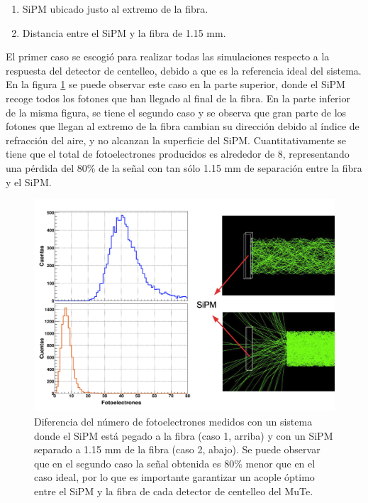 \documentclass[12pt,oneside,openany,letter]{book}
\begin{document}
\begin{enumerate}
\item SiPM ubicado justo al extremo de la fibra.
\item Distancia entre el SiPM y la fibra de 1.15 mm.
\end{enumerate}

El primer caso se escogió para realizar todas las simulaciones respecto a la respuesta del detector de centelleo, debido a que es la referencia ideal del sistema. En la figura \ref{perdida} se puede observar este caso en la parte superior, donde el SiPM recoge todos los fotones que han llegado al final de la fibra. En la parte inferior de la misma figura, se tiene el segundo caso y se observa que gran parte de los fotones que llegan al extremo de la fibra cambian su dirección debido al índice de refracción del aire, y no alcanzan la superficie del SiPM. Cuantitativamente se tiene que el total de fotoelectrones producidos es alrededor de 8, representando una pérdida del 80\% de la señal con tan sólo 1.15 mm de separación entre la fibra y el SiPM. 
\begin{figure}[h!]
    \centering
        \includegraphics[scale=0.5]{perdida.png}
   \caption[Diferencia del número de fotoelectrones medidos con dos sistemas de acople entre el SiPM y la fibra]{Diferencia del número de fotoelectrones medidos con un sistema donde el SiPM está pegado a la fibra (caso 1, arriba) y con un SiPM separado a 1.15 mm de la fibra (caso 2, abajo). Se puede observar que en el segundo caso la señal obtenida es 80\% menor que en el caso ideal, por lo que es importante garantizar un acople \'optimo entre el SiPM y la fibra de cada detector de centelleo del MuTe.}\label{perdida}
\end{figure}
\end{document}
